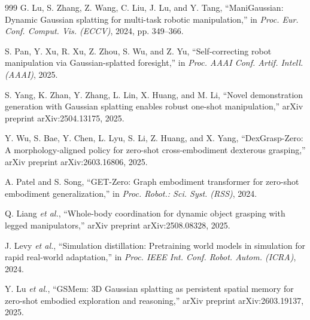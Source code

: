 \documentclass[12pt,a4paper,oneside]{report}
\begin{document}
\begin{thebibliography}{999}
G. Lu, S. Zhang, Z. Wang, C. Liu, J. Lu, and Y. Tang, ``{ManiGaussian}: Dynamic Gaussian splatting for multi-task robotic manipulation,'' in \textit{Proc. Eur. Conf. Comput. Vis. (ECCV)}, 2024, pp. 349--366.




S. Pan, Y. Xu, R. Xu, Z. Zhou, S. Wu, and Z. Yu, ``Self-correcting robot manipulation via Gaussian-splatted foresight,'' in \textit{Proc. AAAI Conf. Artif. Intell. (AAAI)}, 2025.




S. Yang, K. Zhan, Y. Zhang, L. Lin, X. Huang, and M. Li, ``Novel demonstration generation with Gaussian splatting enables robust one-shot manipulation,'' arXiv preprint arXiv:2504.13175, 2025.




Y. Wu, S. Bae, Y. Chen, L. Lyu, S. Li, Z. Huang, and X. Yang, ``{DexGrasp-Zero}: A morphology-aligned policy for zero-shot cross-embodiment dexterous grasping,'' arXiv preprint arXiv:2603.16806, 2025.




A. Patel and S. Song, ``{GET-Zero}: Graph embodiment transformer for zero-shot embodiment generalization,'' in \textit{Proc. Robot.: Sci. Syst. (RSS)}, 2024.




Q. Liang \textit{et al.}, ``Whole-body coordination for dynamic object grasping with legged manipulators,'' arXiv preprint arXiv:2508.08328, 2025.




J. Levy \textit{et al.}, ``Simulation distillation: Pretraining world models in simulation for rapid real-world adaptation,'' in \textit{Proc. IEEE Int. Conf. Robot. Autom. (ICRA)}, 2024.




Y. Lu \textit{et al.}, ``{GSMem}: {3D} Gaussian splatting as persistent spatial memory for zero-shot embodied exploration and reasoning,'' arXiv preprint arXiv:2603.19137, 2025.





\end{thebibliography}
\end{document}
